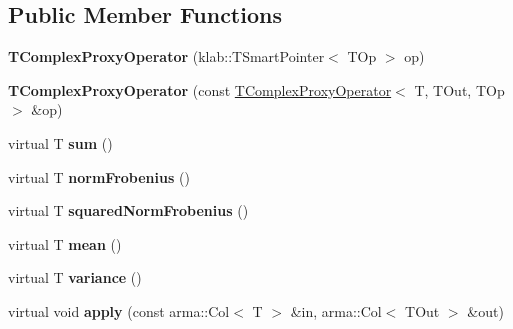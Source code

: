 \subsection*{Public Member Functions}
\begin{DoxyCompactItemize}
\item 
{\bfseries T\+Complex\+Proxy\+Operator} (klab\+::\+T\+Smart\+Pointer$<$ T\+Op $>$ op)\hypertarget{classkl1p_1_1TComplexProxyOperator_acaffd59ce065290cbbb7fc93fff217fe}{}\label{classkl1p_1_1TComplexProxyOperator_acaffd59ce065290cbbb7fc93fff217fe}

\item 
{\bfseries T\+Complex\+Proxy\+Operator} (const \hyperlink{classkl1p_1_1TComplexProxyOperator}{T\+Complex\+Proxy\+Operator}$<$ T, T\+Out, T\+Op $>$ \&op)\hypertarget{classkl1p_1_1TComplexProxyOperator_aaea01041d1eb1e5cf3cc6b265414f0b7}{}\label{classkl1p_1_1TComplexProxyOperator_aaea01041d1eb1e5cf3cc6b265414f0b7}

\item 
virtual T {\bfseries sum} ()\hypertarget{classkl1p_1_1TComplexProxyOperator_aee89f4032bb7cc743ccf1a7cbb90f324}{}\label{classkl1p_1_1TComplexProxyOperator_aee89f4032bb7cc743ccf1a7cbb90f324}

\item 
virtual T {\bfseries norm\+Frobenius} ()\hypertarget{classkl1p_1_1TComplexProxyOperator_a3eedda8db25dcbe04a7413a59f0db62f}{}\label{classkl1p_1_1TComplexProxyOperator_a3eedda8db25dcbe04a7413a59f0db62f}

\item 
virtual T {\bfseries squared\+Norm\+Frobenius} ()\hypertarget{classkl1p_1_1TComplexProxyOperator_a3cf9f2e284dec85b0cc4d53ab899ec0e}{}\label{classkl1p_1_1TComplexProxyOperator_a3cf9f2e284dec85b0cc4d53ab899ec0e}

\item 
virtual T {\bfseries mean} ()\hypertarget{classkl1p_1_1TComplexProxyOperator_aa6872789d8901227bfe63e6f28383c4c}{}\label{classkl1p_1_1TComplexProxyOperator_aa6872789d8901227bfe63e6f28383c4c}

\item 
virtual T {\bfseries variance} ()\hypertarget{classkl1p_1_1TComplexProxyOperator_af752e659bb337a1f5e0ffbb69e3a19f5}{}\label{classkl1p_1_1TComplexProxyOperator_af752e659bb337a1f5e0ffbb69e3a19f5}

\item 
virtual void {\bfseries apply} (const arma\+::\+Col$<$ T $>$ \&in, arma\+::\+Col$<$ T\+Out $>$ \&out)\hypertarget{classkl1p_1_1TComplexProxyOperator_a7b98ac54665f284bf3b3936c1ddfbec3}{}\label{classkl1p_1_1TComplexProxyOperator_a7b98ac54665f284bf3b3936c1ddfbec3}


\end{DoxyCompactItemize}

